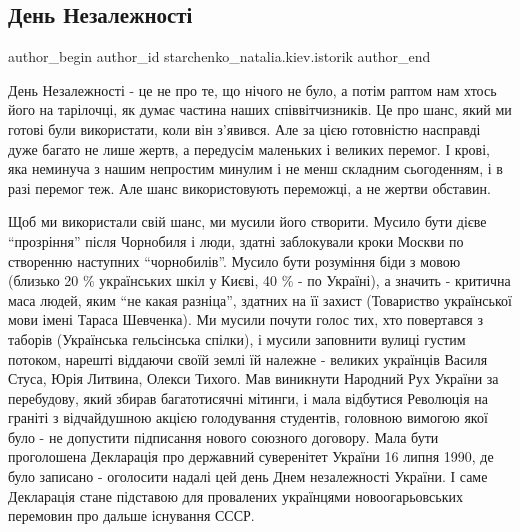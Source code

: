  
 
 
 
 
 
\subsection{День Незалежності}
\label{sec:24_08_2021.fb.starchenko_natalia.kiev.istorik.1.den_nezalezhnosti}
 
\ifcmt
 author_begin
   author_id starchenko_natalia.kiev.istorik
 author_end
\fi

День Незалежності - це не про те, що нічого не було, а потім раптом нам хтось
його на тарілочці, як думає частина наших співвітчизників. Це про шанс, який ми
готові були використати, коли він з’явився. Але за цією готовністю насправді
дуже багато не лише жертв, а передусім маленьких і великих перемог. І крові,
яка неминуча з нашим непростим минулим і не менш складним сьогоденням, і в разі
перемог теж. Але шанс використовують переможці, а не жертви обставин.

Щоб ми використали свій шанс, ми мусили його створити. Мусило бути дієве
\enquote{прозріння} після Чорнобиля і люди, здатні  заблокували кроки Москви по
створенню наступних \enquote{чорнобилів}. Мусило бути розуміння біди з мовою (близько
20 \% українських шкіл у Києві, 40 \% - по Україні), а значить - критична маса
людей, яким \enquote{не какая разніца}, здатних на її захист (Товариство української
мови імені Тараса Шевченка). Ми мусили почути голос тих, хто повертався з
таборів (Українська гельсінська спілки), і мусили заповнити вулиці густим
потоком, нарешті віддаючи своїй землі їй належне - великих українців Василя
Стуса, Юрія Литвина, Олекси Тихого. Мав виникнути Народний Рух України за
перебудову, який збирав багатотисячні мітинги, і мала відбутися Революція на
граніті з відчайдушною акцією голодування студентів, головною вимогою якої було
- не допустити підписання нового союзного договору. Мала бути проголошена
Декларація про державний суверенітет України 16 липня 1990, де було записано -
оголосити надалі цей день Днем незалежності України. І саме Декларація стане
підставою для провалених українцями новоогарьовських перемовин про дальше
існування СССР.

